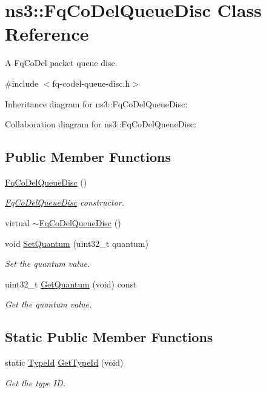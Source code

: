 \hypertarget{classns3_1_1FqCoDelQueueDisc}{}\section{ns3\+:\+:Fq\+Co\+Del\+Queue\+Disc Class Reference}
\label{classns3_1_1FqCoDelQueueDisc}


A Fq\+Co\+Del packet queue disc.  




{\ttfamily \#include $<$fq-\/codel-\/queue-\/disc.\+h$>$}



Inheritance diagram for ns3\+:\+:Fq\+Co\+Del\+Queue\+Disc\+:


Collaboration diagram for ns3\+:\+:Fq\+Co\+Del\+Queue\+Disc\+:
\subsection*{Public Member Functions}
\begin{DoxyCompactItemize}
\item 
\hyperlink{classns3_1_1FqCoDelQueueDisc_a72dcda2a80098ffb4950d219e759a650}{Fq\+Co\+Del\+Queue\+Disc} ()
\begin{DoxyCompactList}\small\item\em \hyperlink{classns3_1_1FqCoDelQueueDisc}{Fq\+Co\+Del\+Queue\+Disc} constructor. \end{DoxyCompactList}\item 
virtual \hyperlink{classns3_1_1FqCoDelQueueDisc_a16aeb65fd0bc4087f3720f13fe622373}{$\sim$\+Fq\+Co\+Del\+Queue\+Disc} ()
\item 
void \hyperlink{classns3_1_1FqCoDelQueueDisc_a3d7f222490f1df11be26ee4b3f0dfce5}{Set\+Quantum} (uint32\+\_\+t quantum)
\begin{DoxyCompactList}\small\item\em Set the quantum value. \end{DoxyCompactList}\item 
uint32\+\_\+t \hyperlink{classns3_1_1FqCoDelQueueDisc_aa3825612fcd4bec24bd0d52e97bd89b5}{Get\+Quantum} (void) const 
\begin{DoxyCompactList}\small\item\em Get the quantum value. \end{DoxyCompactList}\end{DoxyCompactItemize}
\subsection*{Static Public Member Functions}
\begin{DoxyCompactItemize}
\item 
static \hyperlink{classns3_1_1TypeId}{Type\+Id} \hyperlink{classns3_1_1FqCoDelQueueDisc_ac1928d4a228c995d1c24f413fde82bd2}{Get\+Type\+Id} (void)
\begin{DoxyCompactList}\small\item\em Get the type ID. \end{DoxyCompactList}\end{DoxyCompactItemize}
